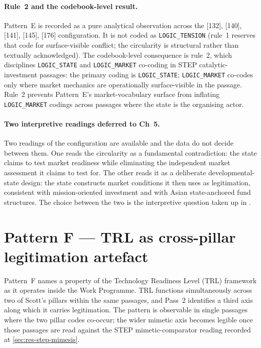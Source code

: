 \paragraph{Rule~2 and the codebook-level result.}
Pattern~E is recorded as a pure analytical observation across the
[132], [140], [141], [145], [176] configuration. It is not coded as
\texttt{LOGIC\_TENSION} (rule~1 reserves that code for
surface-visible conflict; the circularity is structural rather than
textually acknowledged). The codebook-level consequence is rule~2,
which disciplines \texttt{LOGIC\_STATE} and \texttt{LOGIC\_MARKET}
co-coding in STEP catalytic-investment passages: the primary coding
is \texttt{LOGIC\_STATE}; \texttt{LOGIC\_MARKET} co-codes only where
market mechanics are operationally surface-visible in the passage.
Rule~2 prevents Pattern~E's market-vocabulary surface from inflating
\texttt{LOGIC\_MARKET} codings across passages where the state is
the organising actor.

\paragraph{Two interpretive readings deferred to Ch~5.}
Two readings of the configuration are available and the data do not
decide between them. One reads the circularity as a fundamental
contradiction: the state claims to test market readiness while
eliminating the independent market assessment it claims to test for.
The other reads it as a deliberate developmental-state design: the
state constructs market conditions it then uses as legitimation,
consistent with mission-oriented investment and with Asian
state-anchored fund structures. The choice between the two is the
interpretive question taken up in .

\section{Pattern F --- TRL as cross-pillar legitimation artefact}
\label{sec:res-pattern-f}

Pattern~F names a property of the Technology Readiness Level (TRL)
framework as it operates inside the Work Programme. TRL functions
simultaneously across two of Scott's pillars within the same
passages, and Pass~2 identifies a third axis along which it carries
legitimation. The pattern is observable in single passages where the
two pillar codes co-occur; the wider mimetic axis becomes legible
once those passages are read against the STEP mimetic-comparator
reading recorded at \cref{sec:res-step-mimesis}.

